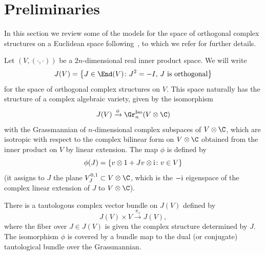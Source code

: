 \section{Preliminaries}\label{section2}
In this section we review some of the models for the space of orthogonal complex structures on a Euclidean space following~\cite[Section~IV.9]{LM}, to which we refer for further details.

Let $(V, (\cdot, \cdot ))$ be a $2n$-dimensional real inner product space. We will write \[J(V)=\big\{ J \in \End(V) \colon J^2=-I, \, J \text{ is orthogonal} \big\}\]
for the space of orthogonal complex structures on $V$. This space naturally has the structure of a complex algebraic variety, given by the isomorphism
\[ J(V) \xrightarrow{\phi} \Gr_n^{\rm Iso}(V\otimes \C) \]
with the Grassmannian of $n$-dimensional complex subspaces of $V\otimes \C$, which are isotropic with respect to the complex bilinear form on $V\otimes \C$ obtained from the inner product on $V$ by linear extension. The map $\phi$ is defined by
\[ \phi(J) = \{ v\otimes 1 + Jv \otimes {\rm i} \colon v \in V\} \]
(it assigns to $J$ the plane $V_J^{0,1} \subset V\otimes \C$, which is the $-{\rm i}$ eigenspace of the complex linear extension of $J$ to $V\otimes \C$).

There is a tautologous complex vector bundle on $J(V)$ defined by
\[J(V) \times V \xrightarrow{\pi_1} J(V),\]
where the fiber over $J\in J(V)$ is given the complex structure determined by $J$.
The isomorphism $\phi$ is covered by a bundle map to the dual (or conjugate) tautological bundle over the Grassmannian.

